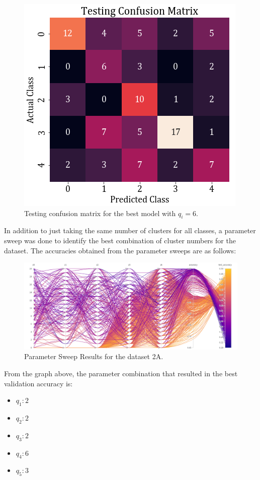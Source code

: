 \documentclass[11pt,a4paper]{article}
\newcommand{\noi}{\noindent}
\begin{document}
\begin{figure}[H]
    \centering
    \includegraphics[scale=0.5]{images/2A/2A_full_test_conf.png}
    \caption{Testing confusion matrix for the best model with $q_i=6$.}
\end{figure}

\noi
In addition to just taking the same number of clusters for all classes, a parameter sweep was done to identify the best combination of cluster numbers for the dataset. The accuracies obtained from the parameter sweeps are as follows:
\begin{figure}[H]
    \centering
    \includegraphics[scale=0.35]{images/2A/2a_parameter_sweep.png}
    \caption{Parameter Sweep Results for the dataset 2A.}
\end{figure}

\noi
From the graph above, the parameter combination that resulted in the best validation accuracy is:
\begin{itemize}
    \itemsep0em
    \item $q_1: 2$
    \item $q_2: 2$
    \item $q_3: 2$
    \item $q_4: 6$
    \item $q_5: 3$
\end{itemize}
\end{document}
